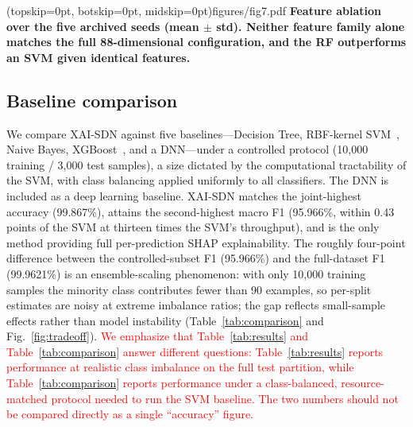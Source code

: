 \documentclass{ieeeaccess}
\begin{document}
\Figure[t!](topskip=0pt, botskip=0pt, midskip=0pt){figures/fig7.pdf}
{ \textbf{Feature ablation over the five archived seeds (mean $\pm$ std). Neither feature family alone matches the full 88-dimensional configuration, and the RF outperforms an SVM given identical features.}\label{fig:ablation}}

\subsection{Baseline comparison}
We compare XAI-SDN against five baselines---Decision Tree, RBF-kernel SVM~\cite{cortes1995svm}, Naive Bayes, XGBoost~\cite{chen2016xgboost}, and a DNN---under a controlled protocol (10,000 training / 3,000 test samples), a size dictated by the computational tractability of the SVM, with class balancing applied uniformly to all classifiers. The DNN is included as a deep learning baseline. XAI-SDN matches the joint-highest accuracy (99.867\%), attains the second-highest macro F1 (95.966\%, within 0.43 points of the SVM at thirteen times the SVM's throughput), and is the only method providing full per-prediction SHAP explainability. The roughly four-point difference between the controlled-subset F1 (95.966\%) and the full-dataset F1 (99.9621\%) is an ensemble-scaling phenomenon: with only 10,000 training samples the minority class contributes fewer than 90 examples, so per-split estimates are noisy at extreme imbalance ratios; the gap reflects small-sample effects rather than model instability (Table~\ref{tab:comparison} and Fig.~\ref{fig:tradeoff}). \textcolor{red}{We emphasize that Table~\ref{tab:results} and Table~\ref{tab:comparison} answer different questions: Table~\ref{tab:results} reports performance at realistic class imbalance on the full test partition, while Table~\ref{tab:comparison} reports performance under a class-balanced, resource-matched protocol needed to run the SVM baseline. The two numbers should not be compared directly as a single ``accuracy'' figure.}
\end{document}
